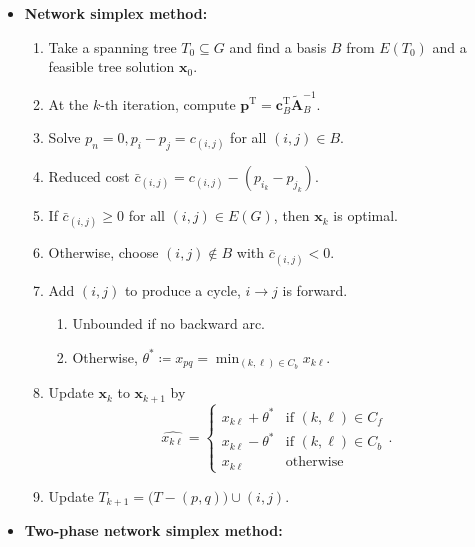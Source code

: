 \documentclass[10pt]{article}
\begin{document}
\begin{multicols*}{3}
\begin{itemize}
            \item \textbf{Network simplex method:}
            \begin{enumerate}
                \item Take a spanning tree $T_0 \subseteq G$ and find a basis $B$ from $E(T_0)$ and a feasible tree solution $\bm{x}_0$.
                \item At the $k$-th iteration, compute $\bm{p}^{\mathrm{T}} = \bm{c}^{\mathrm{T}}_{B}\widetilde{\bm{A}}_{B}^{-1}$.
                \item Solve $p_n = 0, p_i - p_j = c_{(i, j)}$ for all $(i, j) \in B$.
                \item Reduced cost $\bar{c}_{(i, j)} = c_{(i, j)} - (p_{i_k} - p_{j_k})$.
                \item If $\bar{c}_{(i, j)} \geq 0$ for all $(i, j) \in E(G)$, then $\bm{x}_k$ is optimal. 
                \item Otherwise, choose $(i, j) \notin B$ with $\bar{c}_{(i, j)} < 0$.
                \item Add $(i, j)$ to produce a cycle, $i \to j$ is forward.
                \begin{enumerate}
                    \item Unbounded if no backward arc.
                    \item Otherwise, $\theta^* \coloneqq x_{pq} = \min_{(k, {\ell}) \in C_b}x_{k\ell}$.
                \end{enumerate}
                \item Update $\bm{x}_k$ to $\bm{x}_{k + 1}$ by 
                \begin{equation*}
                    \widehat{x_{k\ell}} = \begin{cases}
                        x_{k\ell} + \theta^* & \textrm{if } (k, {\ell}) \in C_f \\
                        x_{k\ell} - \theta^* & \textrm{if } (k, {\ell}) \in C_b \\
                        x_{k\ell} & \textrm{otherwise}
                    \end{cases}.
                \end{equation*}
                \item Update $T_{k + 1} = \bigl(T - (p, q)\bigr)\cup (i, j)$.
            \end{enumerate}
            \item \textbf{Two-phase network simplex method:}
            \begin{enumerate}

\end{enumerate}
\end{itemize}
\end{multicols*}
\end{document}
